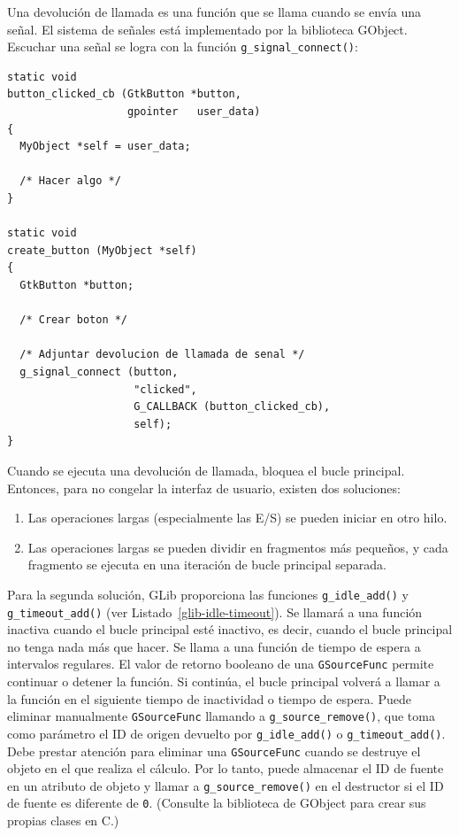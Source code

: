 Una devolución de llamada es una función que se llama cuando se envía una señal. El sistema de señales está implementado por la biblioteca GObject. Escuchar una señal se logra con la función \lstinline{g_signal_connect()}:

\begin{lstlisting}[style=GLib/GTK]
static void
button_clicked_cb (GtkButton *button,
                   gpointer   user_data)
{
  MyObject *self = user_data;

  /* Hacer algo */
}

static void
create_button (MyObject *self)
{
  GtkButton *button;

  /* Crear boton */

  /* Adjuntar devolucion de llamada de senal */
  g_signal_connect (button,
                    "clicked",
                    G_CALLBACK (button_clicked_cb),
                    self);
}
\end{lstlisting}

Cuando se ejecuta una devolución de llamada, bloquea el bucle principal. Entonces, para no congelar la interfaz de usuario, existen dos soluciones:

\begin{enumerate}
    \item Las operaciones largas (especialmente las E/S) se pueden iniciar en otro hilo.
    \item Las operaciones largas se pueden dividir en fragmentos más pequeños, y cada fragmento se ejecuta en una iteración de bucle principal separada.
\end{enumerate}

Para la segunda solución, GLib proporciona las funciones \lstinline{g_idle_add()} y \lstinline{g_timeout_add()} (ver Listado~\ref{glib-idle-timeout}). Se llamará a una función inactiva cuando el bucle principal esté inactivo, es decir, cuando el bucle principal no tenga nada más que hacer. Se llama a una función de tiempo de espera a intervalos regulares. El valor de retorno booleano de una \lstinline{GSourceFunc} permite continuar o detener la función. Si continúa, el bucle principal volverá a llamar a la función en el siguiente tiempo de inactividad o tiempo de espera. Puede eliminar manualmente \lstinline{GSourceFunc} llamando a \lstinline{g_source_remove()}, que toma como parámetro el ID de origen devuelto por \lstinline{g_idle_add()} o \lstinline{g_timeout_add()}. Debe prestar atención para eliminar una \lstinline{GSourceFunc} cuando se destruye el objeto en el que realiza el cálculo. Por lo tanto, puede almacenar el ID de fuente en un atributo de objeto y llamar a \lstinline{g_source_remove()} en el destructor si el ID de fuente es diferente de \lstinline{0}. (Consulte la biblioteca de GObject para crear sus propias clases en C.)

